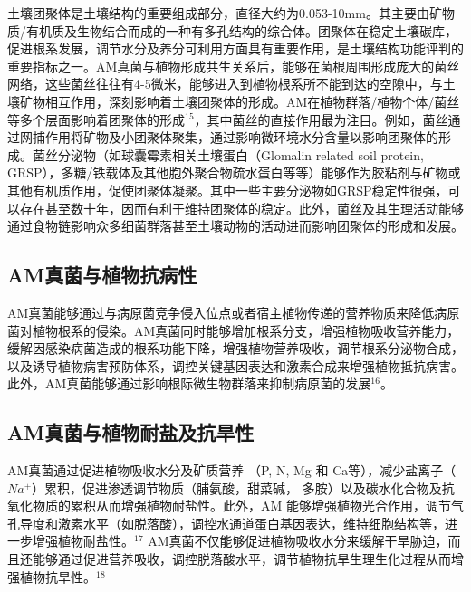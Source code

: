 \documentclass[
]{book}
\begin{document}
土壤团聚体是土壤结构的重要组成部分，直径大约为0.053-10mm。其主要由矿物质/有机质及生物结合而成的一种有多孔结构的综合体。团聚体在稳定土壤碳库，促进根系发展，调节水分及养分可利用方面具有重要作用，是土壤结构功能评判的重要指标之一。AM真菌与植物形成共生关系后，能够在菌根周围形成庞大的菌丝网络，这些菌丝往往有4-5微米，能够进入到植物根系所不能到达的空隙中，与土壤矿物相互作用，深刻影响着土壤团聚体的形成。AM在植物群落/植物个体/菌丝等多个层面影响着团聚体的形成\(^{15}\)，其中菌丝的直接作用最为注目。例如，菌丝通过网捕作用将矿物及小团聚体聚集，通过影响微环境水分含量以影响团聚体的形成。菌丝分泌物（如球囊霉素相关土壤蛋白（Glomalin related soil protein, GRSP），多糖/铁载体及其他胞外聚合物疏水蛋白等等）能够作为胶粘剂与矿物或其他有机质作用，促使团聚体凝聚。其中一些主要分泌物如GRSP稳定性很强，可以存在甚至数十年，因而有利于维持团聚体的稳定。此外，菌丝及其生理活动能够通过食物链影响众多细菌群落甚至土壤动物的活动进而影响团聚体的形成和发展。

\hypertarget{amux771fux83ccux4e0eux690dux7269ux6297ux75c5ux6027}{%
\subsection{AM真菌与植物抗病性}\label{amux771fux83ccux4e0eux690dux7269ux6297ux75c5ux6027}}

AM真菌能够通过与病原菌竞争侵入位点或者宿主植物传递的营养物质来降低病原菌对植物根系的侵染。AM真菌同时能够增加根系分支，增强植物吸收营养能力，缓解因感染病菌造成的根系功能下降，增强植物营养吸收，调节根系分泌物合成，以及诱导植物病害预防体系，调控关键基因表达和激素合成来增强植物抵抗病害。此外，AM真菌能够通过影响根际微生物群落来抑制病原菌的发展\(^{16}\)。

\hypertarget{amux771fux83ccux4e0eux690dux7269ux8010ux76d0ux53caux6297ux65f1ux6027}{%
\subsection{AM真菌与植物耐盐及抗旱性}\label{amux771fux83ccux4e0eux690dux7269ux8010ux76d0ux53caux6297ux65f1ux6027}}

AM真菌通过促进植物吸收水分及矿质营养 （P, N, Mg 和 Ca等），减少盐离子（\(Na^+\)）累积，促进渗透调节物质（脯氨酸，甜菜碱， 多胺）以及碳水化合物及抗氧化物质的累积从而增强植物耐盐性。此外，AM 能够增强植物光合作用，调节气孔导度和激素水平（如脱落酸），调控水通道蛋白基因表达，维持细胞结构等，进一步增强植物耐盐性。\(^{17}\) AM真菌不仅能够促进植物吸收水分来缓解干旱胁迫，而且还能够通过促进营养吸收，调控脱落酸水平，调节植物抗旱生理生化过程从而增强植物抗旱性。\(^{18}\)
\end{document}
